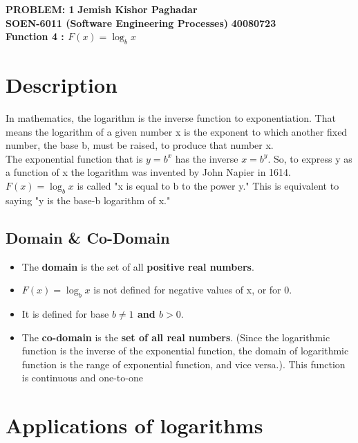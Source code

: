 \documentclass[a4paper, 11pt]{article}
\begin{document}
\noindent
\large\textbf{PROBLEM: 1} \hfill \textbf{Jemish Kishor Paghadar} \\
\normalsize\textbf{ SOEN-6011 (Software Engineering Processes)} \hfill \textbf{40080723} \\
{\centering\textbf{Function 4 :  $F(x)= \log_b x$} \\} 

\section{Description}
    In mathematics, the logarithm is the inverse function to exponentiation. That means the logarithm of a given number x is the exponent to which another fixed number, the base b, must be raised, to produce that number x. \\
    The exponential function that is $y=b^x$ has the inverse $x = b^y$. So, to express y as a function of x the logarithm was invented by John Napier in 1614.\cite{wiki}
    \newline
    \newline
    {\centering\textbf{$F(x)= \log_b x$}} is called "x is equal to b to the power y." This is equivalent to saying "y is the base-b logarithm of x."

\subsection{Domain \& Co-Domain}

    \begin{itemize}[noitemsep]
      \item The \textbf{domain} is the set of all \textbf{positive real numbers}.
      \item {$F(x)= \log_b x$} is not defined for negative values of x, or for 0. 
      \item It is defined for base \textbf{$b\neq1$ and $b>0$}. 
      \item The \textbf{co-domain} is the \textbf{set of all real numbers}. (Since the logarithmic function is the inverse of the exponential function, the domain of logarithmic function is the range of exponential function, and vice versa.). This function is continuous and one-to-one
    \end{itemize}


\section{Applications of logarithms}
\end{document}
